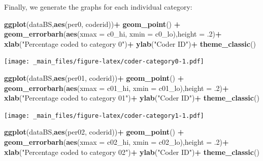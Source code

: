 \documentclass[
]{book}
\newenvironment{Shaded}{\begin{snugshade}}{\end{snugshade}}
\newcommand{\AttributeTok}[1]{\textcolor[rgb]{0.13,0.29,0.53}{#1}}
\newcommand{\DecValTok}[1]{\textcolor[rgb]{0.00,0.00,0.81}{#1}}
\newcommand{\FunctionTok}[1]{\textcolor[rgb]{0.13,0.29,0.53}{\textbf{#1}}}
\newcommand{\NormalTok}[1]{#1}
\newcommand{\SpecialCharTok}[1]{\textcolor[rgb]{0.81,0.36,0.00}{\textbf{#1}}}
\newcommand{\StringTok}[1]{\textcolor[rgb]{0.31,0.60,0.02}{#1}}
\begin{document}
Finally, we generate the graphs for each individual category:

\begin{Shaded}
\begin{Highlighting}[]
\FunctionTok{ggplot}\NormalTok{(dataBS,}\FunctionTok{aes}\NormalTok{(per0, coderid))}\SpecialCharTok{+}
 \FunctionTok{geom\_point}\NormalTok{() }\SpecialCharTok{+}
 \FunctionTok{geom\_errorbarh}\NormalTok{(}\FunctionTok{aes}\NormalTok{(}\AttributeTok{xmax =}\NormalTok{ c0\_hi, }\AttributeTok{xmin =}\NormalTok{ c0\_lo),}\AttributeTok{height =}\NormalTok{ .}\DecValTok{2}\NormalTok{)}\SpecialCharTok{+}
 \FunctionTok{xlab}\NormalTok{(}\StringTok{"Percentage coded to category 0"}\NormalTok{)}\SpecialCharTok{+}
 \FunctionTok{ylab}\NormalTok{(}\StringTok{"Coder ID"}\NormalTok{)}\SpecialCharTok{+}
 \FunctionTok{theme\_classic}\NormalTok{()}
\end{Highlighting}
\end{Shaded}

\texttt{[image: \_main\_files/figure-latex/coder-category0-1.pdf]}

\begin{Shaded}
\begin{Highlighting}[]
\FunctionTok{ggplot}\NormalTok{(dataBS,}\FunctionTok{aes}\NormalTok{(per01, coderid))}\SpecialCharTok{+}
 \FunctionTok{geom\_point}\NormalTok{() }\SpecialCharTok{+}
 \FunctionTok{geom\_errorbarh}\NormalTok{(}\FunctionTok{aes}\NormalTok{(}\AttributeTok{xmax =}\NormalTok{ c01\_hi, }\AttributeTok{xmin =}\NormalTok{ c01\_lo),}\AttributeTok{height =}\NormalTok{ .}\DecValTok{2}\NormalTok{)}\SpecialCharTok{+}
 \FunctionTok{xlab}\NormalTok{(}\StringTok{"Percentage coded to category 01"}\NormalTok{)}\SpecialCharTok{+}
 \FunctionTok{ylab}\NormalTok{(}\StringTok{"Coder ID"}\NormalTok{)}\SpecialCharTok{+}
 \FunctionTok{theme\_classic}\NormalTok{()}
\end{Highlighting}
\end{Shaded}

\texttt{[image: \_main\_files/figure-latex/coder-category1-1.pdf]}

\begin{Shaded}
\begin{Highlighting}[]
\FunctionTok{ggplot}\NormalTok{(dataBS,}\FunctionTok{aes}\NormalTok{(per02, coderid))}\SpecialCharTok{+}
 \FunctionTok{geom\_point}\NormalTok{() }\SpecialCharTok{+}
 \FunctionTok{geom\_errorbarh}\NormalTok{(}\FunctionTok{aes}\NormalTok{(}\AttributeTok{xmax =}\NormalTok{ c02\_hi, }\AttributeTok{xmin =}\NormalTok{ c02\_lo),}\AttributeTok{height =}\NormalTok{ .}\DecValTok{2}\NormalTok{)}\SpecialCharTok{+}
 \FunctionTok{xlab}\NormalTok{(}\StringTok{"Percentage coded to category 02"}\NormalTok{)}\SpecialCharTok{+}
 \FunctionTok{ylab}\NormalTok{(}\StringTok{"Coder ID"}\NormalTok{)}\SpecialCharTok{+}
 \FunctionTok{theme\_classic}\NormalTok{()}
\end{Highlighting}
\end{Shaded}
\end{document}
